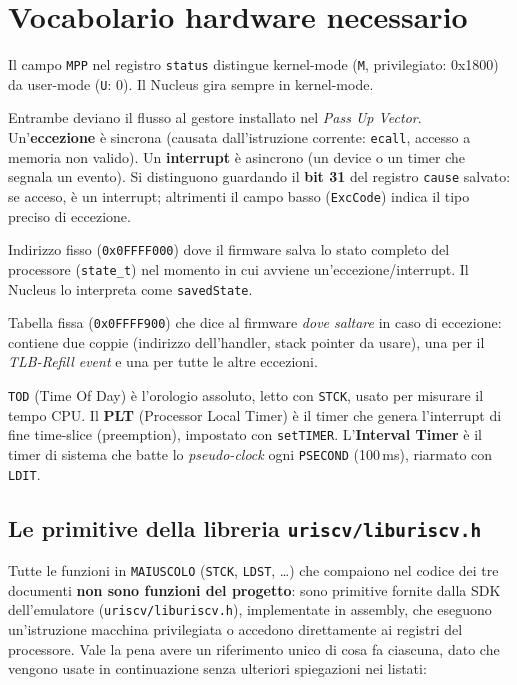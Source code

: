 \documentclass[11pt,a4paper]{article}
\newcommand{\code}[1]{\texttt{#1}}
\begin{document}
\section{Vocabolario hardware necessario}

\begin{description}[style=nextline,leftmargin=0pt]
\item[Kernel vs user mode] Il campo \code{MPP} nel registro \code{status}
  distingue kernel-mode (\code{M}, privilegiato: 0x1800) da user-mode
  (\code{U}: 0). Il Nucleus gira sempre in kernel-mode.
\item[Eccezione vs interrupt] Entrambe deviano il flusso al gestore
  installato nel \emph{Pass Up Vector}. Un'\textbf{eccezione} è sincrona
  (causata dall'istruzione corrente: \code{ecall}, accesso a memoria non
  valido). Un \textbf{interrupt} è asincrono (un device o un timer che
  segnala un evento). Si distinguono guardando il \textbf{bit 31} del
  registro \code{cause} salvato: se acceso, è un interrupt; altrimenti il
  campo basso (\code{ExcCode}) indica il tipo preciso di eccezione.
\item[BIOSDATAPAGE] Indirizzo fisso (\code{0x0FFFF000}) dove il firmware
  salva lo stato completo del processore (\code{state\_t}) nel momento in
  cui avviene un'eccezione/interrupt. Il Nucleus lo interpreta come
  \code{savedState}.
\item[Pass Up Vector] Tabella fissa (\code{0x0FFFF900}) che dice al firmware
  \emph{dove saltare} in caso di eccezione: contiene due coppie
  (indirizzo dell'handler, stack pointer da usare), una per il
  \emph{TLB-Refill event} e una per tutte le altre eccezioni.
\item[TOD / PLT / Interval Timer] \code{TOD} (Time Of Day) è l'orologio
  assoluto, letto con \code{STCK}, usato per misurare il tempo CPU. Il
  \textbf{PLT} (Processor Local Timer) è il timer che genera l'interrupt di
  fine time-slice (preemption), impostato con \code{setTIMER}.
  L'\textbf{Interval Timer} è il timer di sistema che batte lo
  \emph{pseudo-clock} ogni \code{PSECOND} (100\,ms), riarmato con
  \code{LDIT}.
\end{description}

\subsection{Le primitive della libreria \code{uriscv/liburiscv.h}}
Tutte le funzioni in \code{MAIUSCOLO} (\code{STCK}, \code{LDST}, \ldots)
che compaiono nel codice dei tre documenti \textbf{non sono funzioni del
progetto}: sono primitive fornite dalla SDK dell'emulatore
(\code{uriscv/liburiscv.h}), implementate in assembly, che eseguono
un'istruzione macchina privilegiata o accedono direttamente ai registri
del processore. Vale la pena avere un riferimento unico di cosa fa
ciascuna, dato che vengono usate in continuazione senza ulteriori
spiegazioni nei listati:
\end{document}
